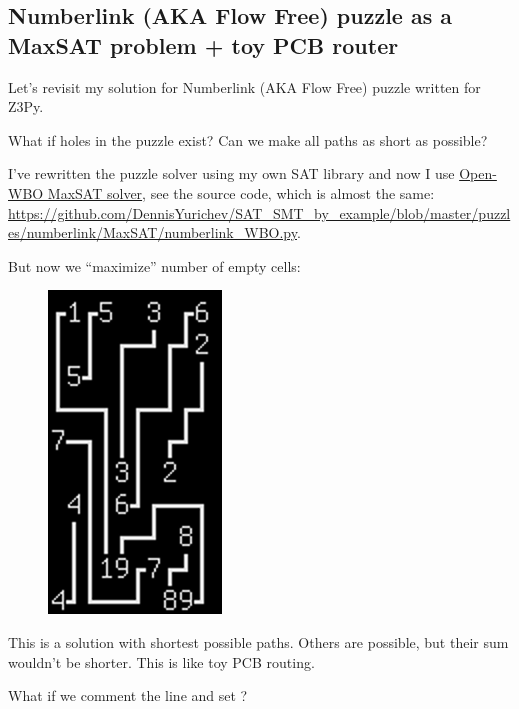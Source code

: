 \subsection{Numberlink (AKA Flow Free) puzzle as a MaxSAT problem + toy \ac{PCB} router}

Let's revisit my solution for Numberlink (AKA Flow Free) puzzle written for Z3Py.

What if holes in the puzzle exist?
Can we make all paths as short as possible?

I've rewritten the puzzle solver using my own SAT library 
and now I use \href{http://sat.inesc-id.pt/open-wbo/}{Open-WBO MaxSAT solver},
see the source code, which is almost the same: \url{https://github.com/DennisYurichev/SAT_SMT_by_example/blob/master/puzzles/numberlink/MaxSAT/numberlink_WBO.py}.

But now we ``maximize'' number of empty cells:


\begin{figure}[H]
\centering
\includegraphics[scale=0.5]{puzzles/numberlink/MaxSAT/MaxSAT.png}
\caption{}
\end{figure}

This is a solution with shortest possible paths. Others are possible, but their sum wouldn't be shorter.
This is like toy \ac{PCB} routing.

What if we comment the  line and set ?


